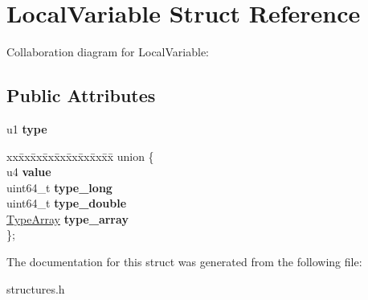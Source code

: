 \hypertarget{structLocalVariable}{}\section{Local\+Variable Struct Reference}
\label{structLocalVariable}


Collaboration diagram for Local\+Variable\+:
\subsection*{Public Attributes}
\begin{DoxyCompactItemize}
\item 
u1 {\bfseries type}\hypertarget{structLocalVariable_a05438f40d41a69cde0a4d50a37bf9420}{}\label{structLocalVariable_a05438f40d41a69cde0a4d50a37bf9420}

\item 
\begin{tabbing}
xx\=xx\=xx\=xx\=xx\=xx\=xx\=xx\=xx\=\kill
union \{\\
\>u4 {\bfseries value}\\
\>uint64\_t {\bfseries type\_long}\\
\>uint64\_t {\bfseries type\_double}\\
\>\hyperlink{structTypeArray}{TypeArray} {\bfseries type\_array}\\
\}; \hypertarget{structLocalVariable_a3570d34d2fed3081d2b7a21bb07cf290}{}\label{structLocalVariable_a3570d34d2fed3081d2b7a21bb07cf290}
\\

\end{tabbing}\end{DoxyCompactItemize}


The documentation for this struct was generated from the following file\+:\begin{DoxyCompactItemize}
\item 
structures.\+h\end{DoxyCompactItemize}
